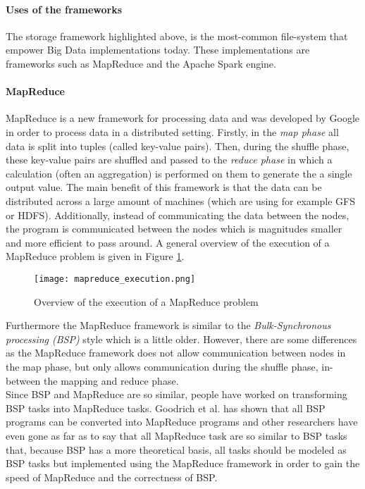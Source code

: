 \paragraph{Uses of the frameworks}
The storage framework highlighted above, is the most-common file-system that empower Big Data implementations today. These implementations are frameworks such as MapReduce and the Apache Spark engine.

\paragraph{MapReduce}
MapReduce is a new framework for processing data and was developed by Google\cite{Dean04} in order to process data in a distributed setting. Firstly, in the \textit{map phase} all data is split into tuples (called key-value pairs). Then, during the shuffle phase, these key-value pairs are shuffled and passed to the \textit{reduce phase} in which a calculation (often an aggregation) is performed on them to generate the a single output value. The main benefit of this framework is that the data can be distributed across a large amount of machines (which are using for example GFS or HDFS). Additionally, instead of communicating the data between the nodes, the program is communicated between the nodes which is magnitudes smaller and more efficient to pass around. A general overview of the execution of a MapReduce problem is given in Figure \ref{mapreduce_execution}.

\begin{figure}
	\texttt{[image: mapreduce\_execution.png]}
	\caption{Overview of the execution of a MapReduce problem\cite{Dean04}}
	\label{mapreduce_execution}
\end{figure}

Furthermore the MapReduce framework is similar to the \textit{Bulk-Synchronous processing (BSP)} style which is a little older. However, there are some differences as the MapReduce framework does not allow communication between nodes in the map phase, but only allows communication during the shuffle phase, in-between the mapping and reduce phase\cite{Pace12}.\\
Since BSP and MapReduce are so similar, people have worked on transforming BSP tasks into MapReduce tasks. Goodrich et al.\cite{Goo11} has shown that all BSP programs can be converted into MapReduce programs and other researchers have even gone as far as to say that all MapReduce task are so similar to BSP tasks that, because BSP has a more theoretical basis, all tasks should be modeled as BSP tasks but implemented using the MapReduce framework in order to gain the speed of MapReduce and the correctness of BSP\cite{Pace12}.

